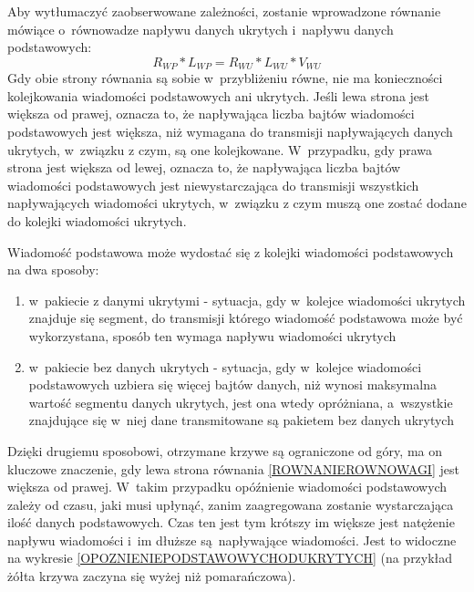 \documentclass[a4paper, twoside, 12pt]{report}
\begin{document}
            Aby wytłumaczyć zaobserwowane zależności, zostanie wprowadzone równanie
            mówiące o~równowadze napływu danych ukrytych i~napływu danych podstawowych:
            \begin{equation} \label{ROWNANIEROWNOWAGI}
            R_{WP} * L_{WP} = R_{WU} * L_{WU} * V_{WU}
            \end{equation}
            Gdy obie strony równania są sobie w~przybliżeniu równe, nie ma konieczności
            kolejkowania wiadomości podstawowych ani ukrytych. Jeśli lewa strona jest
            większa od prawej, oznacza to, że napływająca liczba bajtów wiadomości podstawowych
            jest większa, niż wymagana do transmisji napływających danych ukrytych,
            w~związku z czym, są one kolejkowane. W~przypadku, gdy prawa strona jest
            większa od lewej, oznacza to, że napływająca liczba bajtów wiadomości
            podstawowych jest niewystarczająca do transmisji wszystkich napływających
            wiadomości ukrytych, w~związku z czym muszą one zostać dodane do kolejki
            wiadomości ukrytych.

            Wiadomość podstawowa może wydostać się z kolejki wiadomości podstawowych
            na dwa sposoby:
            \begin{enumerate}
                \item w~pakiecie z danymi ukrytymi - sytuacja, gdy w~kolejce
                    wiadomości ukrytych znajduje się segment, do transmisji którego
                    wiadomość podstawowa może być wykorzystana, sposób ten wymaga
                    napływu wiadomości ukrytych
                \item w~pakiecie bez danych ukrytych - sytuacja, gdy w~kolejce wiadomości
                    podstawowych uzbiera się więcej bajtów danych, niż wynosi
                    maksymalna wartość segmentu danych ukrytych, jest ona wtedy
                    opróżniana, a~wszystkie znajdujące się w~niej dane transmitowane
                    są pakietem bez danych ukrytych
            \end{enumerate}

            Dzięki drugiemu sposobowi, otrzymane krzywe są ograniczone od góry,
            ma on kluczowe znaczenie, gdy lewa strona równania \ref{ROWNANIEROWNOWAGI} jest większa od prawej.
            W~takim przypadku
            opóźnienie wiadomości podstawowych zależy od czasu, jaki musi upłynąć,
            zanim zaagregowana zostanie wystarczająca ilość danych podstawowych.
            Czas ten jest tym krótszy im większe jest natężenie napływu wiadomości
            i~im dłuższe są napływające wiadomości. Jest to widoczne na wykresie
            \ref{OPOZNIENIEPODSTAWOWYCHODUKRYTYCH} (na przykład żółta krzywa zaczyna
            się wyżej niż pomarańczowa).
\end{document}
